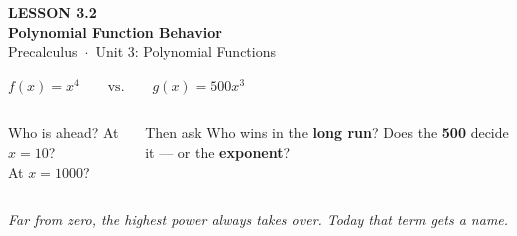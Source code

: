\documentclass[aspectratio=169, 11pt]{beamer}
\begin{document}
{
\begin{frame}[plain]
  \vspace{2.8cm}\hspace{0.55cm}%
  \begin{minipage}{0.9\textwidth}
    {\color{goldacc}\bfseries\small LESSON 3.2}\\[0.5cm]
    {\color{white}\bfseries\LARGE Polynomial Function Behavior}\\[1.2cm]
    {\color{lilacmid}\small Precalculus~$\cdot$~Unit 3: Polynomial Functions}
  \end{minipage}
\end{frame}
}

\begin{frame}[t, plain]

  \begin{center}
    {\Large\bfseries\color{plum} \(f(x) = x^4 \qquad\text{vs.}\qquad g(x) = 500x^3\)}
  \end{center}

  \medskip
  \begin{columns}[T]
      \begin{block}{Who is ahead?}
        At \(x = 10\)? \\[3pt]
        At \(x = 1000\)?
      \end{block}

      \begin{block}{Then ask}
        Who wins in the \textbf{long run}? Does the \textbf{500} decide it --- or the
        \textbf{exponent}?
      \end{block}
  \end{columns}

  \bigskip
  \textit{Far from zero, the highest power always takes over. Today that term gets a name.}
\end{frame}
\end{document}
